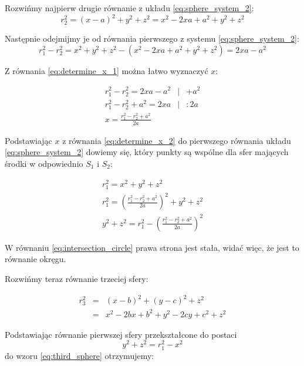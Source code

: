 Rozwińmy najpierw drugie równanie z układu \ref{eq:sphere_system_2}:
\begin{equation}
 r_2^2 = (x - a)^2 + y^2 + z^2 = x^2 - 2xa + a^2 + y^2 + z^2
\end{equation}

Następnie odejmijmy je od równania pierwszego z systemu \ref{eq:sphere_system_2}:
\begin{equation}
 r_1^2 - r_2^2 = x^2 + y^2 + z^2 - (x^2 - 2xa + a^2 + y^2 + z^2) = 2xa - a^2
 \label{eq:determine_x_1}
\end{equation}

Z równania \ref{eq:determine_x_1} można łatwo wyznaczyć $x$:

\begin{eqnarray}
 r_1^2 - r_2^2 = 2xa - a^2 & | & + a^2\\
 r_1^2 - r_2^2 + a^2 = 2xa & | & \colon 2a\\
 x = \frac{r_1^2 - r_2^2 + a^2}{2a} \label{eq:determine_x_2}
\end{eqnarray}

Podstawiając $x$ z równania \ref{eq:determine_x_2} do pierwszego równania układu \ref{eq:sphere_system_2} dowiemy się, który punkty są wspólne dla sfer mających środki w odpowiednio $S_1$ i $S_2$:

\begin{eqnarray}
 r_1^2 = x^2 + y^2 + z^2 \\
 r_1^2 = \left(\frac{r_1^2 - r_2^2 + a^2}{2a}\right)^2 + y^2 + z^2 \\
 y^2 + z^2 = r_1^2 - \left(\frac{r_1^2 - r_2^2 + a^2}{2a}\right)^2 \label{eq:intersection_circle}
\end{eqnarray}

W równaniu \ref{eq:intersection_circle} prawa strona jest stała, widać więc, że jest to równanie okręgu.

Rozwińmy teraz równanie trzeciej sfery:

\begin{eqnarray}
 r^2_3 & = & (x - b)^2 + (y - c)^2 + z^2 \label{eq:third_sphere} \\
       & = & x^2 - 2bx + b^2 + y^2 - 2cy + c^2 + z^2 \nonumber
\end{eqnarray}

Podstawiając równanie pierwszej sfery przekształcone do postaci
\begin{equation*}
 y^2 + z^2 = r_1^2 - x^2
\end{equation*}
do wzoru \ref{eq:third_sphere} otrzymujemy:

